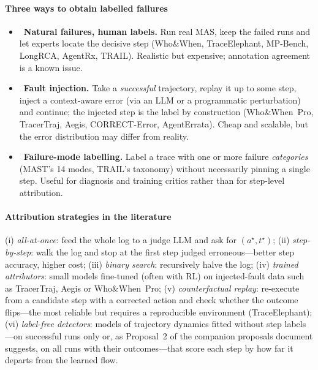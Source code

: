 \paragraph{Three ways to obtain labelled failures}
\begin{itemize}[leftmargin=1.1em]
\item \naturalbadge\ \textbf{Natural failures, human labels.} Run real MAS, keep the failed runs and let experts locate the decisive step (Who\&When, TraceElephant, MP-Bench, LongRCA, AgentRx, TRAIL). Realistic but expensive; annotation agreement is a known issue.
\item \injected\ \textbf{Fault injection.} Take a \emph{successful} trajectory, replay it up to some step, inject a context-aware error (via an LLM or a programmatic perturbation) and continue; the injected step is the label by construction (Who\&When~Pro, TracerTraj, Aegis, CORRECT-Error, AgentErrata). Cheap and scalable, but the error distribution may differ from reality.
\item {}\ \textbf{Failure-mode labelling.} Label a trace with one or more failure \emph{categories} (MAST's 14 modes, TRAIL's taxonomy) without necessarily pinning a single step. Useful for diagnosis and training critics rather than for step-level attribution.
\end{itemize}

\paragraph{Attribution strategies in the literature} (i) \emph{all-at-once}: feed the whole log to a judge LLM and ask for $(a^\star,t^\star)$; (ii) \emph{step-by-step}: walk the log and stop at the first step judged erroneous---better step accuracy, higher cost; (iii) \emph{binary search}: recursively halve the log; (iv) \emph{trained attributors}: small models fine-tuned (often with RL) on injected-fault data such as TracerTraj, Aegis or Who\&When~Pro; (v) \emph{counterfactual replay}: re-execute from a candidate step with a corrected action and check whether the outcome flips---the most reliable but requires a reproducible environment (TraceElephant); (vi) \emph{label-free detectors}: models of trajectory dynamics fitted without step labels---on successful runs only \cite{yeh2026oat} or, as Proposal~2 of the companion proposals document suggests, on all runs with their outcomes---that score each step by how far it departs from the learned flow.
